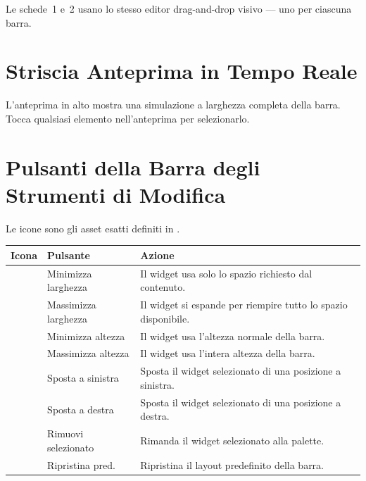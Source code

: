 Le schede~1 e~2 usano lo stesso editor drag-and-drop visivo --- uno per ciascuna barra.


\section{Striscia Anteprima in Tempo Reale}

L'anteprima in alto mostra una simulazione a larghezza completa della barra.
Tocca qualsiasi elemento nell'anteprima per selezionarlo.

\section{Pulsanti della Barra degli Strumenti di Modifica}

Le icone sono gli asset esatti definiti in .

\begin{longtable}{C{1.5cm}L{4.4cm}L{8.3cm}}
\toprule
{}
\color{white}\sffamily\bfseries Icona &
\color{white}\sffamily\bfseries Pulsante &
\color{white}\sffamily\bfseries Azione \\
\midrule
{} & Minimizza larghezza  & Il widget usa solo lo spazio richiesto dal contenuto. \\
 & Massimizza larghezza & Il widget si espande per riempire tutto lo spazio disponibile. \\
   & Minimizza altezza    & Il widget usa l'altezza normale della barra. \\
   & Massimizza altezza   & Il widget usa l'intera altezza della barra. \\
          & Sposta a sinistra    & Sposta il widget selezionato di una posizione a sinistra. \\
         & Sposta a destra      & Sposta il widget selezionato di una posizione a destra. \\
              & Rimuovi selezionato  & Rimanda il widget selezionato alla palette. \\
             & Ripristina pred.     & Ripristina il layout predefinito della barra. \\
\bottomrule
\end{longtable}

